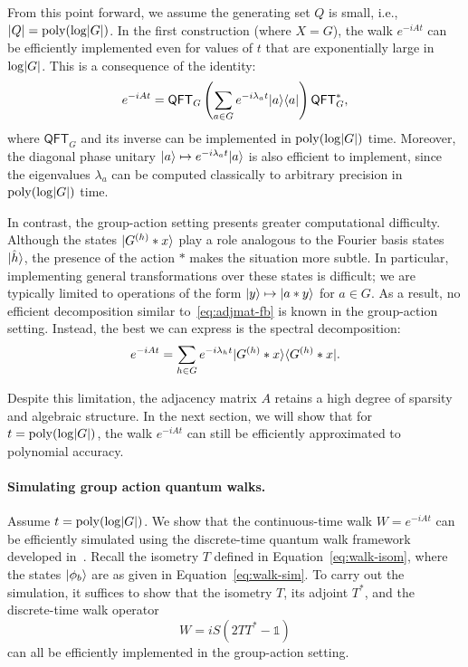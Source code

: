 \documentclass[11pt]{article}
\theoremstyle{definition}
\newcommand{\qft}{\mathsf{QFT}}
\begin{document}
    From this point forward, we assume the generating set \( Q \) is small, i.e., \( \lvert Q\rvert = \operatorname{poly}(\log \lvert G\rvert) \). In the first construction (where \( X = G \)), the walk \( e^{-iAt} \) can be efficiently implemented even for values of \( t \) that are exponentially large in \( \log \lvert G\rvert \). This is a consequence of the identity:
    \begin{equation}
        \label{eq:adjmat-fb}
        e^{-iAt} = \qft_G \left( \sum_{a \in G} e^{-i\lambda_a t} \ket{a} \bra{a} \right) \qft_G^*,
    \end{equation}
    where \( \qft_G \) and its inverse can be implemented in \( \operatorname{poly}(\log \lvert G\rvert) \) time. Moreover, the diagonal phase unitary \( \lvert a\rangle \mapsto e^{-i\lambda_a t} \lvert a\rangle \) is also efficient to implement, since the eigenvalues \( \lambda_a \) can be computed classically to arbitrary precision in \( \operatorname{poly}(\log \lvert G\rvert) \) time.

    In contrast, the group-action setting presents greater computational difficulty. Although the states \( \lvert G^{(h)} * x\rangle \) play a role analogous to the Fourier basis states \( \lvert\hat{h}\rangle \), the presence of the action \( * \) makes the situation more subtle. In particular, implementing general transformations over these states is difficult; we are typically limited to operations of the form \( \lvert y\rangle \mapsto \lvert a * y\rangle \) for \( a \in G \). As a result, no efficient decomposition similar to~\eqref{eq:adjmat-fb} is known in the group-action setting. Instead, the best we can express is the spectral decomposition:
    \[
    e^{-iAt} = \sum_{h \in G} e^{-i\lambda_h t} \lvert G^{(h)} * x\rangle \langle G^{(h)} * x\rvert.
    \]

    Despite this limitation, the adjacency matrix \( A \) retains a high degree of sparsity and algebraic structure. In the next section, we will show that for \( t = \operatorname{poly}(\log \lvert G\rvert) \), the walk \( e^{-iAt} \) can still be efficiently approximated to polynomial accuracy.


    
\paragraph{Simulating group action quantum walks.}
Assume \( t = \operatorname{poly}(\log \lvert G\rvert) \). We show that the continuous-time walk \( W = e^{-iAt} \) can be efficiently simulated using the discrete-time quantum walk framework developed in~\cite{childs2010relationship, berry2015hamiltonian}. Recall the isometry \( T \) defined in Equation~\eqref{eq:walk-isom}, where the states \( \lvert\phi_b\rangle \) are as given in Equation~\eqref{eq:walk-sim}. To carry out the simulation, it suffices to show that the isometry \( T \), its adjoint \( T^* \), and the discrete-time walk operator
\[
W = iS(2TT^* - \mathds{1})
\]
can all be efficiently implemented in the group-action setting.
\end{document}
